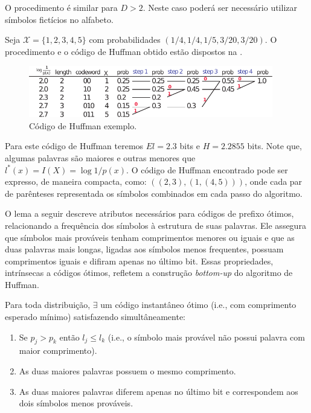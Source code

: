 O procedimento é similar para $D > 2$. Neste caso poderá ser necessário utilizar símbolos fictícios no alfabeto.

\begin{example}
Seja $\mathcal{X} = \{1,2,3,4,5\}$ com probabilidades $(1/4, 1/4, 1/5, 3/20, 3/20)$.
O procedimento e o código de Huffman obtido estão dispostos na .

       \begin{figure}[h!]
       \centering
       \includegraphics[width=0.95\textwidth]{figures/ex-huffman01.pdf}
       \caption{Código de Huffman exemplo.}\label{fig:ex-huffman01}
       \end{figure}

Para este código de Huffman teremos $E l = 2.3$ bits e $H=2.2855$ bits.
Note que, algumas palavras são maiores e outras menores que $l^\ast(x) = I(X) = \log 1/p(x)$.
O código de Huffman encontrado pode ser expresso, de maneira compacta, como: $((2,3),(1,(4,5)))$,
onde cada par de parênteses representada os símbolos combinados em cada passo do algoritmo.
\end{example}

O lema a seguir descreve atributos necessários para códigos de prefixo ótimos,
relacionando a frequência dos símbolos à estrutura de suas palavras. Ele
assegura que símbolos mais prováveis tenham comprimentos menores ou iguais e
que as duas palavras mais longas, ligadas aos símbolos menos frequentes,
possuam comprimentos iguais e difiram apenas no último bit. Essas propriedades,
intrínsecas a códigos ótimos, refletem a construção \emph{bottom-up} do algoritmo de
Huffman.


\begin{lemma}\label{lem:propcodinstot}
Para toda distribuição, $\exists$ um código instantâneo ótimo (i.e., com comprimento esperado mínimo)
satisfazendo simultâneamente:
\begin{enumerate}
  \item\label{propcodinstot1} Se $p_j > p_k$ então $l_j \leq l_k$ (i.e., o símbolo mais provável não possui palavra com maior comprimento).
  \item\label{propcodinstot2} As duas maiores palavras possuem o mesmo comprimento.
  \item\label{propcodinstot3} As duas maiores palavras diferem apenas no último bit e correspondem aos dois símbolos menos prováveis.
\end{enumerate}
\end{lemma}

